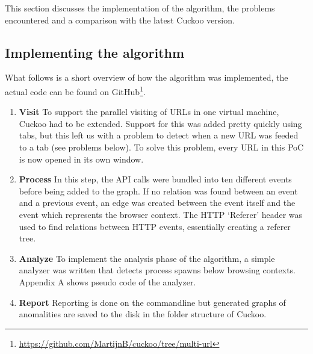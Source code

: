 This section discusses the implementation of the algorithm, the problems encountered and a comparison with the latest Cuckoo version.

\subsection{Implementing the algorithm}

What follows is a short overview of how the algorithm was implemented, the actual code can be found on GitHub\footnote{\url{https://github.com/MartijnB/cuckoo/tree/multi-url}}.

\begin{enumerate}
\item \textbf{Visit} To support the parallel visiting of URLs in one virtual machine, Cuckoo had to be extended. Support for this was added pretty quickly using tabs, but this left us with a problem to detect when a new URL was feeded to a tab (see problems below). To solve this problem, every URL in this PoC is now opened in its own window.

\item \textbf{Process} In this step, the API calls were bundled into ten different events before being added to the graph. If no relation was found between an event and a previous event, an edge was created between the event itself and the event which represents the browser context. The HTTP `Referer' header was used to find relations between HTTP events, essentially creating a referer tree\cite{qui}. 

\item \textbf{Analyze} To implement the analysis phase of the algorithm, a simple analyzer was written that detects process spawns below browsing contexts. Appendix A shows pseudo code of the analyzer.


\item \textbf{Report} Reporting is done on the commandline but generated graphs of anomalities are saved to the disk in the folder structure of Cuckoo.
\end{enumerate}

